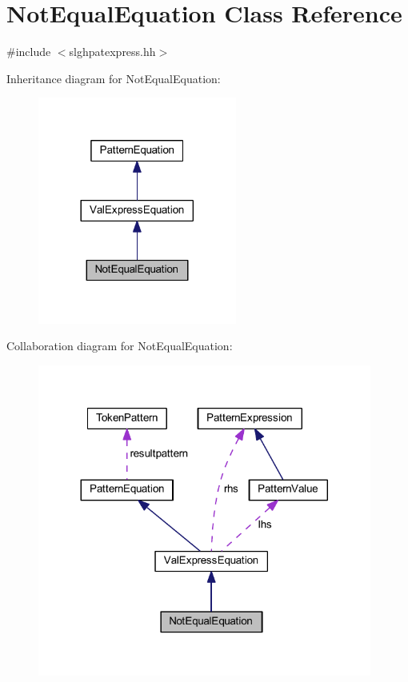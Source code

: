 \hypertarget{class_not_equal_equation}{}\section{Not\+Equal\+Equation Class Reference}
\label{class_not_equal_equation}


{\ttfamily \#include $<$slghpatexpress.\+hh$>$}



Inheritance diagram for Not\+Equal\+Equation\+:
\nopagebreak
\begin{figure}[H]
\begin{center}
\leavevmode
\includegraphics[width=185pt]{class_not_equal_equation__inherit__graph}
\end{center}
\end{figure}


Collaboration diagram for Not\+Equal\+Equation\+:
\nopagebreak
\begin{figure}[H]
\begin{center}
\leavevmode
\includegraphics[width=311pt]{class_not_equal_equation__coll__graph}
\end{center}
\end{figure}
